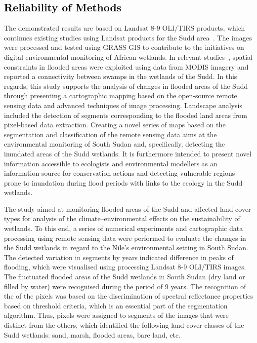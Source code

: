 \documentclass[analytics,article,accept,pdftex,moreauthors]{Definitions/mdpi}
\begin{document}
\subsection{\textcolor{black}{Reliability of Methods}}
The demonstrated results are based on Landsat 8-9 OLI/TIRS products, which continues existing studies using Landsat products for the Sudd area~\cite{Petersenetal2008}. The images were processed and tested using GRASS GIS to contribute to the initiatives on digital environmental monitoring of African wetlands. In relevant studies~\cite{DIVITTORIO2021100922}, spatial constraints in flooded areas were exploited using data from MODIS imagery and reported a connectivity between swamps in the wetlands of the Sudd. In this regards, this study supports the analysis of changes in flooded areas of the Sudd through presenting a cartographic mapping based on the open-source remote sensing data and advanced techniques of image processing. Landscape analysis included the detection of segments corresponding to the flooded land areas from pixel-based data extraction. Creating a novel series of maps based on the segmentation and classification of the remote sensing data aims at the environmental monitoring of South Sudan and, specifically, detecting the inundated areas of the Sudd wetlands. It is furthermore intended to present novel information accessible to  ecologists and environmental modellers as an information source for conservation actions and detecting vulnerable regions prone to inundation during flood periods with links to the ecology in the Sudd wetlands. 

The study aimed at monitoring flooded areas of the Sudd and affected land cover types for analysis of the climate--environmental effects on the sustainability of wetlands. To this end, a series of numerical experiments and cartographic data processing using remote sensing data were performed to evaluate the changes in the Sudd wetlands in regard to the Nile's environmental setting in South Sudan. The detected variation in segments by years indicated difference in peaks of flooding, which were visualised using processing Landsat 8-9 OLI/TIRS images. The fluctuated flooded areas of the Sudd wetlands in South Sudan (dry land or filled by water) were recognised during the period of 9 years. The recognition of the of the pixels was based on  the discrimination of spectral reflectance properties based on threshold criteria, which is an essential part of the segmentation algorithm. %
Thus, pixels were assigned to segments of the images that were distinct from the others, which identified the following land cover classes of the Sudd wetlands: sand, marsh, flooded areas, bare land, etc.
\end{document}
